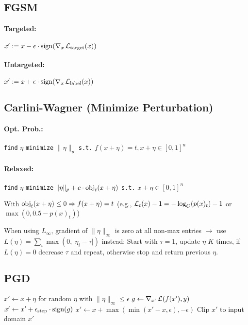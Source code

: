 \subsection*{FGSM}
\paragraph{Targeted:} 
$x' := x - \epsilon \cdot \operatorname{sign}(\nabla_x \operatorname{\mathcal{L}}_\text{target}(x))$

\paragraph{Untargeted:}
$x' := x + \epsilon \cdot \operatorname{sign}(\nabla_x \operatorname{\mathcal{L}}_\text{label}(x))$

\subsection*{Carlini-Wagner (Minimize Perturbation)}
\paragraph{Opt. Prob.:} \texttt{find} $\eta$ \texttt{minimize} $\|\eta\|_p$ \texttt{s.t.} $f(x+\eta) =t, x+\eta \in [0,1]^n$
\paragraph{Relaxed:} \texttt{find} $\eta$ \texttt{minimize} $\|\eta\|_p + c \cdot \operatorname{obj}_t(x+\eta)$ \texttt{s.t.} $x+\eta \in [0,1]^n$

With $\operatorname{obj}_t(x+\eta) \le 0 \Rightarrow f(x+\eta) = t$ (e.g., $\operatorname{\mathcal{L}}_t(x) - 1 = -\log_C(p(x)_t) - 1$ or $\max(0, 0.5- p(x)_t)$)

When using $L_\infty$, gradient of $\|\eta\|_\infty$ is zero at all non-max entries $\rightarrow$ use $L(\eta) = \sum_i \max(0, \lvert \eta_i - \tau \rvert)$ instead; Start with $\tau=1$, update $\eta$ $K$ times, if $L(\eta) = 0$ decrease $\tau$ and repeat, otherwise stop and return previous $\eta$. 

\subsection*{PGD}

\begin{algorithmic}
\State $x' \gets x + \eta$ for random $\eta$ with $\|\eta\|_\infty \le \epsilon$
    \State $g \gets \nabla_{x'} \operatorname{\mathcal{L}}(f(x'), y)$ 
    \State $x' \gets x' +  \epsilon_\text{step} \cdot \operatorname{sign}(g)$ 
    \State $x' \gets x + \max(\min(x'-x, \epsilon), -\epsilon)$
    \State Clip $x'$ to input domain 
\EndFor
\State \Return $x'$
\EndFunction
\end{algorithmic}

